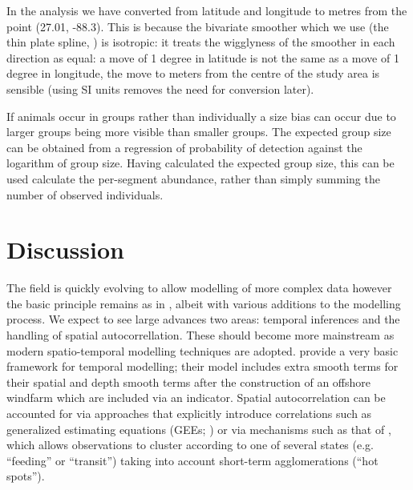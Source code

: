 \documentclass[a4paper,12pt]{article}
\begin{document}
%

In the analysis we have converted from latitude and longitude to metres from the point (27.01, -88.3). This is because the bivariate smoother which we use (the thin plate spline, \cite{Wood:2003tc}) is isotropic: it treats the wigglyness of the smoother in each direction as equal: a move of 1 degree in latitude is not the same as a move of 1 degree in longitude, the move to meters from the centre of the study area is sensible (using SI units removes the need for conversion later).

If animals occur in groups rather than individually a size bias can occur due to larger groups being more visible than smaller groups. The expected group size can be obtained from a regression of probability of detection against the logarithm of group size. Having calculated the expected group size, this can be used calculate the per-segment abundance, rather than simply summing the number of observed individuals.

\section*{Discussion}
\label{s:discussion}

The field is quickly evolving to allow modelling of more complex data however the basic principle remains as in \cite{Hedley:2004et}, albeit with various additions to the modelling process. We expect to see large advances two areas: temporal inferences and the handling of spatial autocorrellation. These should become more mainstream as modern spatio-temporal modelling techniques are adopted. \cite{Petersen:2011vy} provide a very basic framework for temporal modelling; their model includes extra smooth terms for their spatial and depth smooth terms after the construction of an offshore windfarm which are included via an indicator. Spatial autocorrelation can be accounted for via approaches that explicitly introduce correlations such as generalized estimating equations (GEEs; \cite{Hardin:2003uf}) or via mechanisms such as that of \cite{Skaug:2006gs}, which allows observations to cluster according to one of several states (e.g. ``feeding'' or ``transit'') taking into account short-term agglomerations (``hot spots'').
\end{document}
